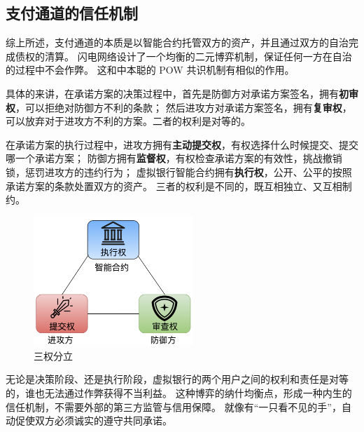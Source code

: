 \subsection{支付通道的信任机制}
综上所述，支付通道的本质是以智能合约托管双方的资产，并且通过双方的自治完成债权的清算。
闪电网络设计了一个均衡的二元博弈机制，保证任何一方在自治的过程中不会作弊。
这和中本聪的 POW 共识机制有相似的作用。

具体的来讲，在承诺方案的决策过程中，首先是防御方对承诺方案签名，拥有\textbf{初审权}，可以拒绝对防御方不利的条款；
然后进攻方对承诺方案签名，拥有\textbf{复审权}，可以放弃对于进攻方不利的方案。二者的权利是对等的。

在承诺方案的执行过程中，进攻方拥有\textbf{主动提交权}，有权选择什么时候提交、提交哪一个承诺方案；
防御方拥有\textbf{监督权}，有权检查承诺方案的有效性，挑战撤销锁，惩罚进攻方的违约行为；
虚拟银行智能合约拥有\textbf{执行权}，公开、公平的按照承诺方案的条款处置双方的资产。
三者的权利是不同的，既互相独立、又互相制约。

\begin{figure}[h!]
    \centering
    \includegraphics[width=6cm, keepaspectratio]{../images/trias.png}
    \caption{三权分立}
    \label{fig:trias}
\end{figure}

无论是决策阶段、还是执行阶段，虚拟银行的两个用户之间的权利和责任是对等的，谁也无法通过作弊获得不当利益。
这种博弈的纳什均衡点，形成一种内生的信任机制，不需要外部的第三方监管与信用保障。
就像有“一只看不见的手”，自动促使双方必须诚实的遵守共同承诺。

